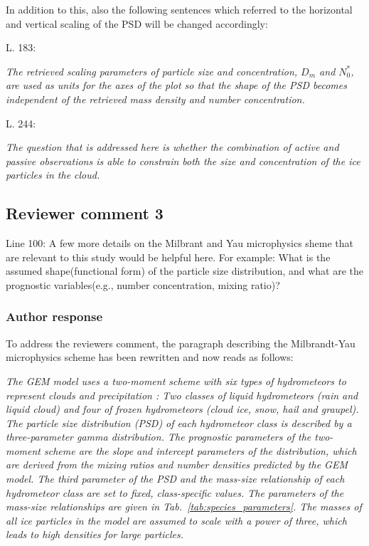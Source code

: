 \documentclass[11pt]{scrartcl}
\begin{document}
\begin{itemize}
In addition to this, also the following sentences which referred to the horizontal and vertical
scaling of the PSD will be changed accordingly:

L. 183:

\textit{ The retrieved scaling parameters of particle size and concentration,
  $D_m$ and $N_0^*$, are used as units for the axes of the plot so that the
  shape of the PSD becomes independent of the retrieved mass density and number
  concentration. }

L. 244:

\textit{The question that is addressed here is whether the combination of active
  and passive observations is able to constrain both the size and concentration
  of the ice particles in the cloud.}

\subsection*{Reviewer comment 3}

Line 100: A few more details on the Milbrant and Yau microphysics sheme that are relevant to this study would be helpful here. For example: What is the assumed shape(functional form) of the particle size distribution, and what are the prognostic variables(e.g., number concentration, mixing ratio)?

\subsubsection*{Author response}

To address the reviewers comment, the paragraph describing the Milbrandt-Yau microphysics scheme
has been rewritten and now reads as follows:

\textit{
The GEM model uses a two-moment scheme with six types of hydrometeors to
represent clouds and precipitation \citep{milbrandtyau05}: Two classes of liquid
hydrometeors (rain and liquid cloud) and four of frozen hydrometeors (cloud ice,
snow, hail and graupel). The particle size distribution (PSD) of each
hydrometeor class is described by a three-parameter gamma distribution. The
prognostic parameters of the two-moment scheme are the slope and intercept
parameters of the distribution, which are derived from the mixing ratios and
number densities predicted by the GEM model. The third parameter of the PSD and
the mass-size relationship of each hydrometeor class are set to fixed,
class-specific values. The parameters of the mass-size relationships are given
in Tab.~\ref{tab:species_parameters}. The masses of all ice particles in the
model are assumed to scale with a power of three, which leads to high densities
for large particles.
  }


\end{itemize}
\end{document}
